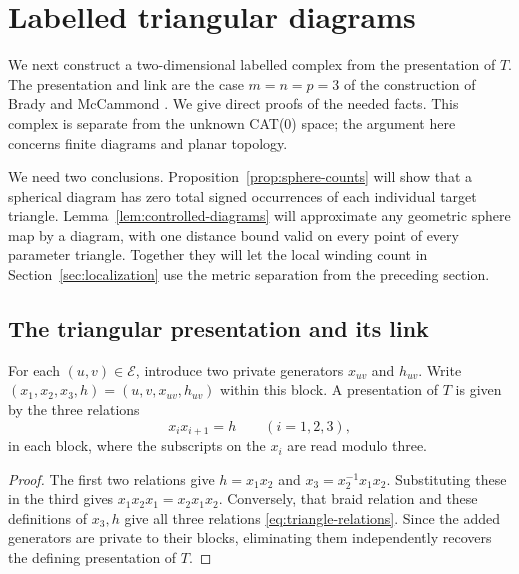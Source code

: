 \section{Labelled triangular diagrams}
\label{sec:diagrams}

We next construct a two-dimensional labelled complex from the presentation
of $T$.  The presentation and link are the case $m=n=p=3$ of the
construction of Brady and McCammond \cite{BradyMcCammond2000}.
We give direct proofs of the needed facts.  This complex is separate
from the unknown CAT(0) space; the argument here concerns finite
diagrams and planar topology.

We need two conclusions.  Proposition~\ref{prop:sphere-counts} will
show that a spherical diagram has zero total signed occurrences of
each individual target triangle.  Lemma~\ref{lem:controlled-diagrams}
will approximate any geometric sphere map by a diagram, with one
distance bound valid on every point of every parameter triangle.
Together they will let the local winding count in
Section~\ref{sec:localization} use the metric separation from the
preceding section.

\subsection{The triangular presentation and its link}

\begin{lemma}\label{lem:triangular-presentation}
For each $(u,v)\in\mathcal E$, introduce two private generators
$x_{uv}$ and $h_{uv}$.  Write
$(x_1,x_2,x_3,h)=(u,v,x_{uv},h_{uv})$ within this block.  A presentation
of $T$ is given by the three relations
\begin{equation}\label{eq:triangle-relations}
  x_i x_{i+1}=h\qquad (i=1,2,3),
\end{equation}
in each block, where the subscripts on the $x_i$ are read modulo three.
\end{lemma}

\begin{proof}
The first two relations give $h=x_1x_2$ and
$x_3=x_2^{-1}x_1x_2$.  Substituting these in the third gives
$x_1x_2x_1=x_2x_1x_2$.  Conversely, that braid relation and these
definitions of $x_3,h$ give all three relations
\eqref{eq:triangle-relations}.  Since the added generators are private
to their blocks, eliminating them independently recovers the defining
presentation of $T$.
\end{proof}

